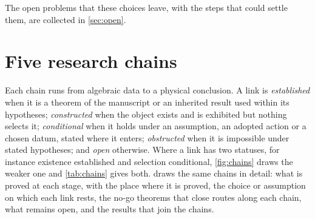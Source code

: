 The open problems that these choices leave, with the steps that could settle them, are collected in \cref{sec:open}.

\section{Five research chains}
\label{sec:chains}

Each chain runs from algebraic data to a physical conclusion. A link is \emph{established} when it is a theorem of the manuscript or an
inherited result used within its hypotheses; \emph{constructed} when the object exists and is exhibited but nothing selects it;
\emph{conditional} when it holds under an assumption, an adopted action or a chosen datum, stated where it enters; \emph{obstructed} when it is
impossible under stated hypotheses; and \emph{open} otherwise. Where a link has two statuses, for instance existence established and
selection conditional, \cref{fig:chains} draws the weaker one and \cref{tab:chains} gives both.  draws the same
chains in detail: what is proved at each stage, with the place where it is proved, the choice or assumption on which each link rests, the
no-go theorems that close routes along each chain, what remains open, and the results that join the chains.

